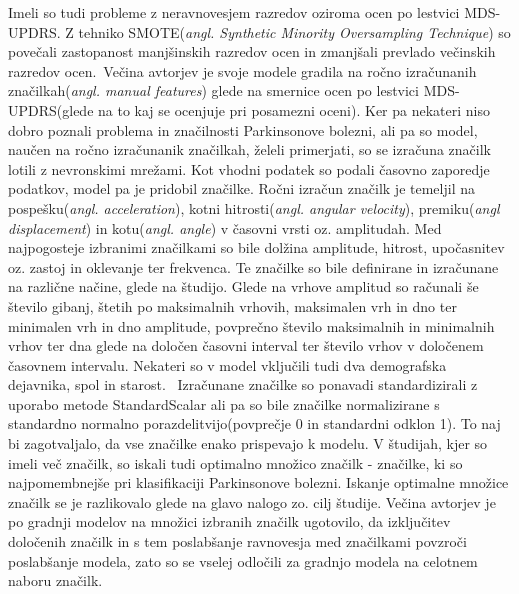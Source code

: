 \documentclass[a4paper,12pt]{article}
\begin{document}
Imeli so tudi probleme z neravnovesjem razredov oziroma ocen po lestvici MDS-UPDRS. Z tehniko SMOTE(\textit{angl. 
Synthetic Minority Oversampling Technique}) so povečali zastopanost manjšinskih razredov ocen in zmanjšali 
prevlado večinskih razredov ocen.\
Večina avtorjev je svoje modele gradila na ročno izračunanih značilkah(\textit{angl. manual features}) glede na 
smernice ocen po lestvici MDS-UPDRS(glede na to kaj se ocenjuje pri posamezni oceni). Ker pa nekateri 
niso dobro poznali problema in značilnosti Parkinsonove bolezni, ali pa so model, naučen na ročno izračunanik 
značilkah, želeli primerjati, so se izračuna značilk lotili z nevronskimi mrežami. Kot vhodni podatek so podali 
časovno zaporedje podatkov, model pa je pridobil značilke. Ročni izračun značilk je temeljil na pospešku(\textit{angl. 
acceleration}), kotni hitrosti(\textit{angl. angular velocity}), premiku(\textit{angl displacement}) in kotu(\textit{angl. angle}) v 
časovni vrsti oz. amplitudah. Med najpogosteje izbranimi značilkami so bile dolžina amplitude, hitrost, 
upočasnitev oz. zastoj in oklevanje ter frekvenca. Te značilke so bile definirane in izračunane na različne 
načine, glede na študijo. Glede na vrhove amplitud so računali še število gibanj, štetih po maksimalnih 
vrhovih, maksimalen vrh in dno ter minimalen vrh in dno amplitude, povprečno število maksimalnih in 
minimalnih vrhov ter dna glede na določen časovni interval ter število vrhov v določenem časovnem 
intervalu. Nekateri so v model vključili tudi dva demografska dejavnika, spol in starost. \
Izračunane značilke so ponavadi standardizirali z uporabo metode StandardScalar ali pa so bile značilke 
normalizirane s standardno normalno porazdelitvijo(povprečje 0 in standardni odklon 1). To naj bi zagotvaljalo, 
da vse značilke enako prispevajo k modelu. V študijah, kjer so imeli več značilk, so iskali tudi optimalno 
množico značilk - značilke, ki so najpomembnejše pri klasifikaciji Parkinsonove bolezni. Iskanje optimalne 
množice značilk se je razlikovalo glede na glavo nalogo zo. cilj študije. Večina avtorjev je po gradnji modelov 
na množici izbranih značilk ugotovilo, da izključitev določenih značilk in s tem poslabšanje ravnovesja med 
značilkami povzroči poslabšanje modela, zato so se vselej odločili za gradnjo modela na celotnem naboru značilk. \\
\end{document}
